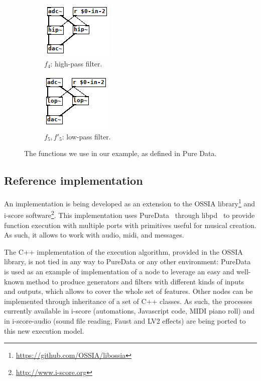 \documentclass{article}
\begin{document}
\begin{figure}
    \begin{subfigure}{0.21\textwidth}\centering
        \includegraphics[scale=0.5]{images/pd-4.png}
        \caption{$f_4$: high-pass filter.}
    \end{subfigure}
    \begin{subfigure}{0.21\textwidth}\centering
        \includegraphics[scale=0.5]{images/pd-5.png}
        \caption{$f_5, f'_5$: low-pass filter.}
    \end{subfigure}
    \caption{The functions we use in our example, as defined in Pure Data.}
    \label{fig.pdpatches}
\end{figure}

\subsection{Reference implementation}
An implementation is being developed as an extension to the OSSIA library\footnote{\url{https://github.com/OSSIA/libossia}} and i-score software\footnote{\url{http://www.i-score.org}}. 
This implementation uses PureData~\cite{puckette1996pure} through libpd~\cite{brinkmann2011embedding} to provide function execution with multiple ports with primitives useful for musical creation. 
As such, it allows to work with audio, midi, and messages.

The C++ implementation of the execution algorithm, provided in the OSSIA library, is not tied in any way to PureData or any other environment: PureData is used as an example of implementation of a node to leverage an easy and well-known method to produce generators and filters with different kinds of inputs and outputs, which allows to cover the whole set of features.
Other nodes can be implemented through inheritance of a set of C++ classes.
As such, the processes currently available in i-score (automations, Javascript code, MIDI piano roll) and in i-score-audio (sound file reading, Faust and LV2 effects) are being ported to this new execution model.
\end{document}
